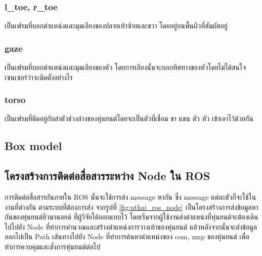 \subsubsection*{l\_toe, r\_toe}
เป็นเฟรมที่บอกตำแหน่งและมุมเอียงของปลายเท้าซ้ายและขวา โดยอยู่บนพื้นผิวที่สัมผัสอยู่

\subsubsection*{gaze}
เป็นเฟรมที่บอกตำแหน่งและมุมเอียงของหัว โดยการเอียงนั้นจะบอกทิศทางของหัวโดยไม่ได้สนใจเซนเซอร์ว่าจะติดตั้งอย่างไร

\subsubsection*{torso}
เป็นเฟรมที่ติดอยู่กับลำตัวช่วงล่างของหุ่นยนต์โดยจะเป็นตัวที่เชื่อม ขา แขน ตัว หัว เข้าเอาไว้ด้วยกัน


\clearpage
\subsection{Box model}

\clearpage
\subsection{โครงสร้างการติดต่อสื่อสารระหว่าง Node ใน ROS}
การติดต่อสื่อสารกันภายใน ROS นั้นจะใช้การส่ง message หากัน ซึ่ง message แต่ละตัวก็จะใช้ในงานที่ต่างกัน
ตามระบบที่ต้องการส่ง จากรูปที่ \ref{fig:uthai_ros_node} เป็นโครงสร้างการส่งข้อมูลหากันของหุ่นยนต์ฮิวมานอยด์
ที่ผู้วิจัยได้ออกแบบไว้ โดยเริ่มจากผู้ใช้งานส่งตำแหน่งที่หุ่นยนต์จะต้องเดินไปไปยัง Node ที่ทำการคำนวณและสร้างตำแหน่งการวางเท้าของหุ่นยนต์
แล้วหลังจากนั้นจะส่งข้อมูลออกไปเป็น Path เส้นทางไปยัง Node ที่ทำการค้นหาตำแหน่งของ com, zmp ของหุ่นยนต์
เพื่อทำการควบคุมและสั่งการหุ่นยนต์ต่อไป

